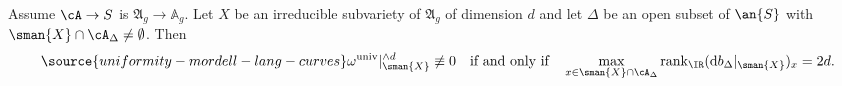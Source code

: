 \begin{proposition}
\notready\label{PropBettiFormNonDegUnivAb}
Assume $\cA \rightarrow S$ is $\mathfrak{A}_g \rightarrow \mathbb A_g$. Let $X$ be an irreducible subvariety of $\mathfrak{A}_g$ of dimension
$d$ and let $\Delta$ be an open subset of $\an{S}$ with $\sman{X}\cap\cA_\Delta\not=\emptyset$. Then
\begin{equation}
\label{prop:bettformvsrankuniv}
\source{uniformity-mordell-lang-curves}
 \omega^{\mathrm{univ}}|_{\sman{X}}^{\wedge d} \not\equiv 0
\quad\text{if and only if}\quad
\max_{x \in \sman{X}\cap\cA_\Delta} \mathrm{rank}_{\IR} (\mathrm{d}b_\Delta|_{\sman{X}})_{x} = 2d.
\end{equation}
\end{proposition}
